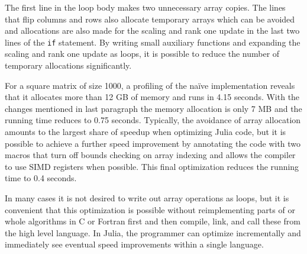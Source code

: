 The first line in the loop body makes two unnecessary array copies. The lines that flip columns and rows also allocate temporary arrays which can be avoided and allocations are also made for the scaling and rank one update in the last two lines of the \texttt{if} statement. By writing small auxiliary functions and expanding the scaling and rank one update as loops, it is possible to reduce the number of temporary allocations significantly.

For a square matrix of size 1000, a profiling of the na\"ive implementation reveals that it  allocates more than 12 GB of memory and runs in 4.15 seconds. With the changes mentioned in last paragraph the memory allocation is only 7 MB and the running time reduces to 0.75 seconds. Typically, the avoidance of array allocation amounts to the largest share of speedup when optimizing Julia code, but it is possible to achieve a further speed improvement by annotating the code with two macros that turn off bounds checking on array indexing and allows the compiler to use SIMD registers when possible. This final optimization reduces the running time to 0.4 seconds.

In many cases it is not desired to write out array operations as loops, but it is convenient that this optimization is possible without reimplementing parts of or whole algorithms in C or Fortran first and then compile, link, and call these from the high level language. In Julia, the programmer can optimize incrementally and immediately see eventual speed improvements within a single language.
